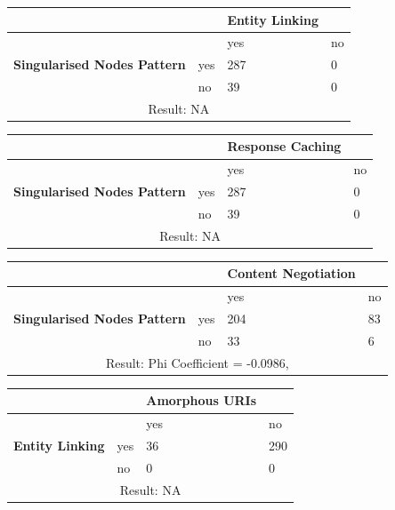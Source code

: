 \documentclass[a4paper,12pt]{article}
\begin{document}
\begin{center}
  \begin{tabular}{| p{60mm} | p{10mm} | p{35mm} | p{35mm} |}
  \hline
   & & \textbf{Entity Linking} &
  \\
  \hline
  & & yes & no
  \\
  \hline
  \textbf{Singularised Nodes Pattern} & yes & 287 & 0
  \\
  \hline
   & no & 39 & 0
  \\
  \hline
  \multicolumn{4}{|c|}{Result: NA}
  \\ \hline
  \end{tabular}
  \end{center}

\begin{center}
  \begin{tabular}{| p{60mm} | p{10mm} | p{35mm} | p{35mm} |}
  \hline
   & & \textbf{Response Caching} &
  \\
  \hline
  & & yes & no
  \\
  \hline
  \textbf{Singularised Nodes Pattern} & yes & 287 & 0
  \\
  \hline
   & no & 39 & 0
  \\
  \hline
  \multicolumn{4}{|c|}{Result: NA}
  \\ \hline
  \end{tabular}
  \end{center}

\begin{center}
  \begin{tabular}{| p{60mm} | p{10mm} | p{35mm} | p{35mm} |}
  \hline
   & & \textbf{Content Negotiation} &
  \\
  \hline
  & & yes & no
  \\
  \hline
  \textbf{Singularised Nodes Pattern} & yes & 204 & 83
  \\
  \hline
   & no & 33 & 6
  \\
  \hline
  \multicolumn{4}{|c|}{Result: Phi Coefficient = -0.0986, }
  \\ \hline
  \end{tabular}
  \end{center}

\begin{center}
  \begin{tabular}{| p{60mm} | p{10mm} | p{35mm} | p{35mm} |}
  \hline
   & & \textbf{Amorphous URIs} &
  \\
  \hline
  & & yes & no
  \\
  \hline
  \textbf{Entity Linking} & yes & 36 & 290
  \\
  \hline
   & no & 0 & 0
  \\
  \hline
  \multicolumn{4}{|c|}{Result: NA}
  \\ \hline
  \end{tabular}
  \end{center}
\end{document}
